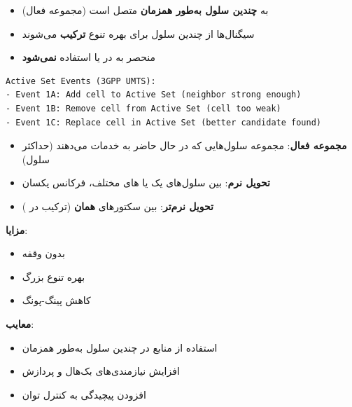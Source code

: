 
\begin{itemize}
\tightlist
\item
   به \textbf{چندین سلول به‌طور همزمان} متصل است (مجموعه فعال)
\item
  سیگنال‌ها از چندین سلول برای بهره تنوع \textbf{ترکیب} می‌شوند
\item
  منحصر به   در  یا  استفاده \textbf{نمی‌شود}
\end{itemize}


\def\CNcodelang{}

\begin{CNplaincode}
\begin{Verbatim}
Active Set Events (3GPP UMTS):
- Event 1A: Add cell to Active Set (neighbor strong enough)
- Event 1B: Remove cell from Active Set (cell too weak)
- Event 1C: Replace cell in Active Set (better candidate found)
\end{Verbatim}
\end{CNplaincode}


\begin{itemize}
\tightlist
\item
  \textbf{مجموعه فعال}: مجموعه سلول‌هایی که در حال حاضر به  خدمات می‌دهند (حداکثر  سلول)
\item
  \textbf{تحویل نرم}: بین سلول‌های یک  یا های مختلف، فرکانس یکسان
\item
  \textbf{تحویل نرم‌تر}: بین سکتورهای \textbf{همان}  (ترکیب  در )
\end{itemize}

\textbf{مزایا}:

\begin{itemize}
\tightlist
\item
  بدون وقفه
\item
  بهره تنوع بزرگ 
\item
  کاهش پینگ-پونگ
\end{itemize}

\textbf{معایب}:

\begin{itemize}
\tightlist
\item
  استفاده از منابع در چندین سلول به‌طور همزمان
\item
  افزایش نیازمندی‌های بک‌هال و پردازش
\item
  افزودن پیچیدگی به کنترل توان
\end{itemize}

